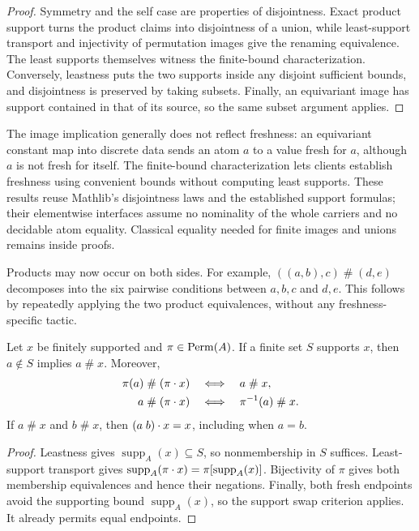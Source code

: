 \begin{proof}
Symmetry and the self case are properties of disjointness. Exact product
support turns the product claims into disjointness of a union, while
least-support transport and injectivity of permutation images give the
renaming equivalence. The least supports themselves witness the finite-bound
characterization. Conversely, leastness puts the two supports inside any
disjoint sufficient bounds, and disjointness is preserved by taking subsets.
Finally, an equivariant image has support contained in that of its source,
so the same subset argument applies.
\end{proof}

The image implication generally does not reflect freshness: an equivariant
constant map into discrete data sends an atom $a$ to a value fresh for $a$,
although $a$ is not fresh for itself. The finite-bound characterization lets
clients establish freshness using convenient bounds without computing least
supports. These results reuse Mathlib's disjointness laws and the established
support formulas; their elementwise interfaces assume no nominality of the
whole carriers and no decidable atom equality. Classical equality needed for
finite images and unions remains inside proofs.

Products may now occur on both sides. For example,
$((a,b),c)\mathrel{\#}(d,e)$ decomposes into the six pairwise conditions
between $a,b,c$ and $d,e$. This follows by repeatedly applying the two
product equivalences, without any freshness-specific tactic.

\begin{proposition}
\label{prop:freshness-laws}
Let $x$ be finitely supported and $\pi\in\operatorname{Perm}(A)$.
If a finite set $S$ supports $x$, then $a\notin S$ implies
$a\mathrel{\#}x$. Moreover,
\begin{align*}
  \pi(a)\mathrel{\#}(\pi\mathbin{\cdot} x)
    &\quad\Longleftrightarrow\quad a\mathrel{\#}x,\\
  a\mathrel{\#}(\pi\mathbin{\cdot} x)
    &\quad\Longleftrightarrow\quad \pi^{-1}(a)\mathrel{\#}x.
\end{align*}
If $a\mathrel{\#}x$ and $b\mathrel{\#}x$, then
$(a\;b)\mathbin{\cdot} x=x$, including when $a=b$.
\end{proposition}

\begin{proof}
Leastness gives $\operatorname{supp}_A(x)\subseteq S$, so nonmembership
in $S$ suffices. Least-support transport gives
$\operatorname{supp}_A(\pi\mathbin{\cdot} x)=\pi[\operatorname{supp}_A(x)]$.
Bijectivity of $\pi$ gives both membership equivalences and hence their
negations. Finally, both fresh endpoints avoid the supporting bound
$\operatorname{supp}_A(x)$, so the support swap criterion applies.
It already permits equal endpoints.
\end{proof}

